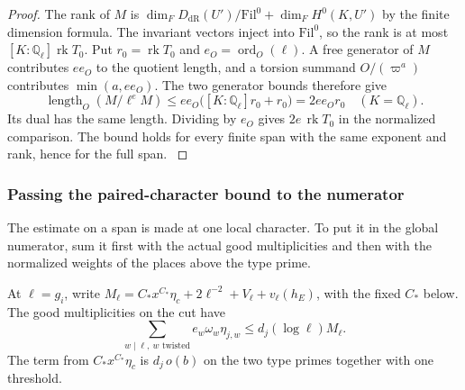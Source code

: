 \begin{proof}
The rank of \(M\) is
\(\dim_F D_{\mathrm{dR}}(U')/\mathrm{Fil}^0+
\dim_F H^0(K,U')\) by the finite dimension formula.
The invariant vectors inject into \(\mathrm{Fil}^0\),
so the rank is at most \([K:\mathbb Q_\ell]\operatorname{rk}T_0\).
Put \(r_0=\operatorname{rk} T_0\) and
\(e_O=\operatorname{ord}_O(\ell)\). A free generator of \(M\)
contributes \(ee_O\) to the quotient length, and a torsion
summand \(O/(\varpi^a)\) contributes \(\min(a,ee_O)\).
The two generator bounds therefore give
\[
 \operatorname{length}_O(M/\ell^e M)
 \le ee_O\bigl([K:\mathbb Q_\ell]r_0+r_0\bigr)
 =2ee_O r_0\quad(K=\mathbb Q_\ell).
\]
Its dual has the same length. Dividing by \(e_O\)
gives \(2e\,\operatorname{rk}T_0\) in the normalized
comparison. The bound holds for every finite span with
the same exponent and rank, hence for the full span.
\cite[Proposition 3.8 and Corollary 3.8.4]{bloch-kato}
\label{cor:special-prime-lengths-4}
\end{proof}

\subsubsection*{Passing the paired-character bound to the numerator}

The estimate on a span is made at one local character. To put it in the global numerator, sum it first with the actual good multiplicities and then with the normalized weights of the places above the type prime.

\begin{proposition}\label{prop:type-prime-row-length}
At \(\ell=g_i\), write \(M_\ell=C_*x^{C_*}\eta_c+
2\ell^{-2}+V_\ell+v_\ell(h_E)\), with the fixed \(C_*\) below.
The good multiplicities on the cut have
\[
 \sum_{w\mid\ell,\ w\text{ twisted}}
       e_w\omega_w\eta_{j,w}\le d_j(\log\ell)M_\ell.
\]
The term from \(C_*x^{C_*}\eta_c\) is \(d_j\,o(b)\)
on the two type primes together with one threshold.
\end{proposition}

